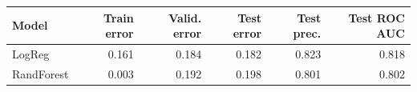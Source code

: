 \begin{tabular}{lrrrrr}
\hline
 Model      &   Train error &   Valid. error &   Test error &   Test prec. &   Test ROC AUC \\
\hline
 LogReg     &         0.161 &          0.184 &        0.182 &        0.823 &          0.818 \\
 RandForest &         0.003 &          0.192 &        0.198 &        0.801 &          0.802 \\
\hline
\end{tabular}